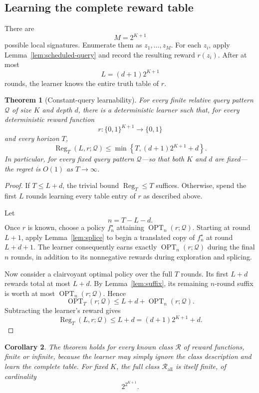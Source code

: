 \documentclass[11pt]{article}
\newtheorem{theorem}{Theorem}[section]
\newtheorem{corollary}[theorem]{Corollary}
\newcommand{\QQ}{\mathcal Q}
\newcommand{\RR}{\mathcal R}
\newcommand{\OPT}{\operatorname{OPT}}
\newcommand{\Reg}{\operatorname{Reg}}
\begin{document}
\subsection{Learning the complete reward table}

There are
\[
    M=2^{K+1}
\]
possible local signatures.  Enumerate them as $z_1,\ldots,z_M$.  For each $z_i$, apply Lemma~\ref{lem:scheduled-query} and record the resulting reward $r(z_i)$.  After at most
\[
    L=(d+1)2^{K+1}
\]
rounds, the learner knows the entire truth table of $r$.

\begin{theorem}[Constant-query learnability]\label{thm:main-upper}
For every finite relative query pattern $\QQ$ of size $K$ and depth $d$, there is a deterministic learner such that, for every deterministic reward function
\[
    r:\{0,1\}^{K+1}\to\{0,1\}
\]
and every horizon $T$,
\[
    \boxed{
    \Reg_T(L,r;\QQ)
    \leq
    \min\left\{
        T,
        (d+1)2^{K+1}+d
    \right\}.
    }
\]
In particular, for every fixed query pattern $\QQ$---so that both $K$ and $d$ are fixed---the regret is $O(1)$ as $T\to\infty$.
\end{theorem}

\begin{proof}
If $T\leq L+d$, the trivial bound $\Reg_T\leq T$ suffices.  Otherwise, spend the first $L$ rounds learning every table entry of $r$ as described above.

Let
\[
    n=T-L-d.
\]
Once $r$ is known, choose a policy $f_n^\star$ attaining $\OPT_n(r;\QQ)$.  Starting at round $L+1$, apply Lemma~\ref{lem:splice} to begin a translated copy of $f_n^\star$ at round $L+d+1$.  The learner consequently earns exactly $\OPT_n(r;\QQ)$ during the final $n$ rounds, in addition to its nonnegative rewards during exploration and splicing.

Now consider a clairvoyant optimal policy over the full $T$ rounds.  Its first $L+d$ rewards total at most $L+d$.  By Lemma~\ref{lem:suffix}, its remaining $n$-round suffix is worth at most $\OPT_n(r;\QQ)$.  Hence
\[
    \OPT_T(r;\QQ)
    \leq L+d+\OPT_n(r;\QQ).
\]
Subtracting the learner's reward gives
\[
    \Reg_T(L,r;\QQ)\leq L+d
    =(d+1)2^{K+1}+d.
\]
\end{proof}

\begin{corollary}
The theorem holds for every known class $\RR$ of reward functions, finite or infinite, because the learner may simply ignore the class description and learn the complete table.  For fixed $K$, the full class $\RR_{\mathrm{all}}$ is itself finite, of cardinality
\[
    2^{2^{K+1}}.
\]
\end{corollary}
\end{document}

